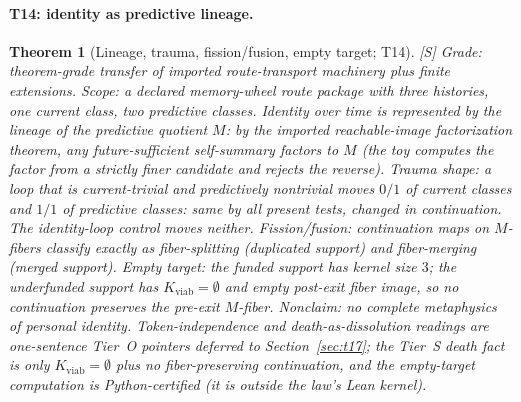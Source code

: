 \documentclass[11pt]{article}
\newcommand{\gradeS}{\textsf{[S]}}
\newcommand{\Kviab}{K_{\mathrm{viab}}}
\newtheorem{theorem}{Theorem}[section]
\theoremstyle{definition}
\begin{document}
\paragraph{T14: identity as predictive lineage.}
\begin{theorem}[Lineage, trauma, fission/fusion, empty target; T14]
\gradeS{} \emph{Grade:} theorem-grade transfer of imported route-transport
machinery plus finite extensions. \emph{Scope:} a declared memory-wheel route
package with three histories, one current class, two predictive classes.
Identity over time is represented by the lineage of the predictive quotient
$M$: by the imported reachable-image factorization theorem, any
future-sufficient self-summary factors to $M$ (the toy computes the factor
from a strictly finer candidate and rejects the reverse). \emph{Trauma
shape:} a loop that is current-trivial and predictively nontrivial moves
$0/1$ of current classes and $1/1$ of predictive classes: same by all
present tests, changed in continuation. The identity-loop control moves
neither. \emph{Fission/fusion:} continuation maps on $M$-fibers classify
exactly as fiber-splitting (duplicated support) and fiber-merging (merged
support). \emph{Empty target:} the funded support has kernel size $3$; the
underfunded support has $\Kviab=\emptyset$ and empty post-exit fiber image,
so no continuation preserves the pre-exit $M$-fiber. \emph{Nonclaim:} no
complete metaphysics of personal identity. Token-independence and
death-as-dissolution readings are one-sentence Tier~O pointers deferred to
Section~\ref{sec:t17}; the Tier~S death fact is only $\Kviab=\emptyset$ plus
no fiber-preserving continuation, and the empty-target computation is
Python-certified (it is outside the law's Lean kernel).
\end{theorem}
\end{document}
